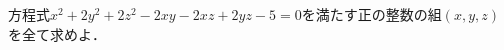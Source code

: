 \documentclass[../../main.tex]{subfiles}
\begin{document}
方程式$x^2+2y^2+2z^2-2xy-2xz+2yz-5=0$を満たす正の整数の組$(x,y,z)$を全て求めよ．
\end{document}

